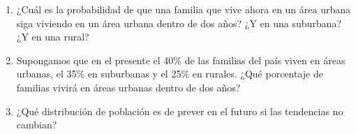 \documentclass{templateNote}
\begin{document}
\begin{enumerate}[start = 6]
    \begin{enumerate}[label=\alph*)]
        \item ¿Cuál es la probabilidad de que una familia que vive ahora en un área urbana siga viviendo
        en un área urbana dentro de dos años? ¿Y en una suburbana? ¿Y en una rural?
        \item Supongamos que en el presente el 40\% de las familias del país viven en áreas urbanas, el
        35\% en suburbanas y el 25\% en rurales. ¿Qué porcentaje de familias vivirá en áreas urbanas
        dentro de dos años?
        \item ¿Qué distribución de población es de prever en el futuro si las tendencias no cambian?
    \end{enumerate}
\end{enumerate}
\end{document}
